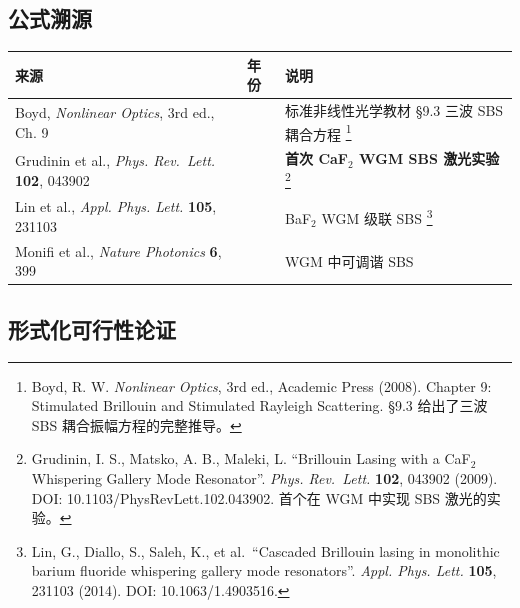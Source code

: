 \documentclass[
  11pt,
  a4paper,
]{ctexrep}
\newcounter{none} %
\begin{document}
\subsection{公式溯源}\label{ux516cux5f0fux6eafux6e90}

{\def\LTcaptype{none} %
\begin{longtable}[]{@{}
  >{\raggedright\arraybackslash}p{}
  >{\centering\arraybackslash}p{}
  >{\raggedright\arraybackslash}p{}@{}}
\toprule\noalign{}
\begin{minipage}[b]{\linewidth}\raggedright
来源
\end{minipage} & \begin{minipage}[b]{\linewidth}\centering
年份
\end{minipage} & \begin{minipage}[b]{\linewidth}\raggedright
说明
\end{minipage} \\
\midrule\noalign{}
\endhead
\bottomrule\noalign{}
\endlastfoot
Boyd, \emph{Nonlinear Optics}, 3rd ed., Ch. 9 & 2008 &
标准非线性光学教材 §9.3 三波 SBS 耦合方程 \footnote{Boyd, R. W.
  \emph{Nonlinear Optics}, 3rd ed., Academic Press (2008). Chapter 9:
  Stimulated Brillouin and Stimulated Rayleigh Scattering. §9.3
  给出了三波 SBS 耦合振幅方程的完整推导。} \\
Grudinin et al., \emph{Phys. Rev.~Lett.} \textbf{102}, 043902 & 2009 &
\textbf{首次 CaF\(_2\) WGM SBS 激光实验} \footnote{Grudinin, I. S.,
  Matsko, A. B., Maleki, L. ``Brillouin Lasing with a CaF\(_2\)
  Whispering Gallery Mode Resonator''. \emph{Phys. Rev.~Lett.}
  \textbf{102}, 043902 (2009). DOI: 10.1103/PhysRevLett.102.043902.
  首个在 WGM 中实现 SBS 激光的实验。} \\
Lin et al., \emph{Appl. Phys. Lett.} \textbf{105}, 231103 & 2014 &
BaF\(_2\) WGM 级联 SBS \footnote{Lin, G., Diallo, S., Saleh, K., et
  al.~``Cascaded Brillouin lasing in monolithic barium fluoride
  whispering gallery mode resonators''. \emph{Appl. Phys. Lett.}
  \textbf{105}, 231103 (2014). DOI: 10.1063/1.4903516.} \\
Monifi et al., \emph{Nature Photonics} \textbf{6}, 399 & 2012 & WGM
中可调谐 SBS \\
\end{longtable}
}

\subsection{形式化可行性论证}\label{ux5f62ux5f0fux5316ux53efux884cux6027ux8bbaux8bc1}
\end{document}
